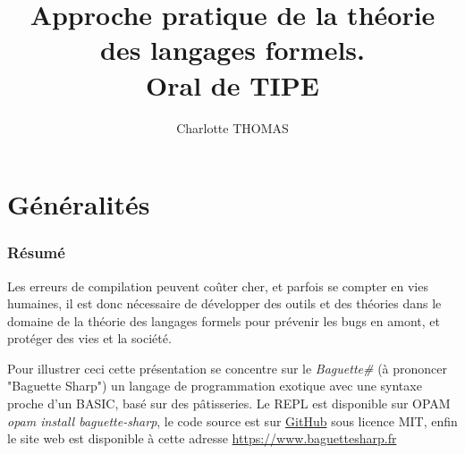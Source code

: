\documentclass{beamer}
\title{Approche pratique de la théorie des langages formels. \\ Oral de TIPE}
\author{Charlotte THOMAS}
\newcommand{\bsf}{Baguette\# }
\begin{document}
    \frame{\titlepage}
    \section{Généralités}
    \begin{frame}
        \frametitle{Résumé}
        Les erreurs de compilation peuvent coûter cher, et parfois se compter en vies humaines, il est donc 
        nécessaire de développer des outils et des théories dans le domaine de la théorie des langages formels 
        pour prévenir les bugs en amont, et protéger des vies et la société.\pause


        Pour illustrer ceci cette présentation se concentre sur le \textit{\bsf} (à prononcer "Baguette Sharp") un langage 
        de programmation exotique avec une syntaxe proche d'un BASIC, basé sur des pâtisseries.
        Le REPL est disponible sur OPAM \textit{opam install baguette-sharp}, le code source est sur \href{https://github.com/coco33920/ocaml-baguettesharp-interpreter}{GitHub}
        sous licence MIT, enfin le site web est disponible à cette adresse \url{https://www.baguettesharp.fr}
    \end{frame}
    
\end{document}
